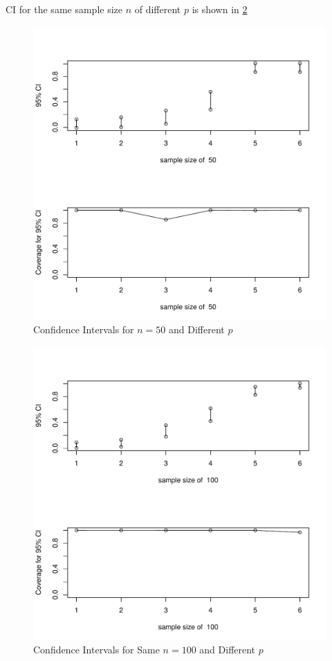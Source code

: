 \documentclass[12pt,letterpaper,titlepage,en-US]{article}
\begin{document}
CI for the same sample size $n$ of different $p$ is shown in \cref{sndp}
\begin{figure}[H]
    \caption{Confidence Intervals for $n = 50$ and Different $p$}
    \label{sndp}
    \centering
    \includegraphics[width=.9\textwidth]{figure/sameN50.pdf}
\end{figure}
\begin{figure}[H]
    \caption{Confidence Intervals for Same $n = 100$ and Different $p$}
    \label{sndp}
    \centering
    \includegraphics[width=.9\textwidth]{figure/sameN100.pdf}
\end{figure}
\end{document}
